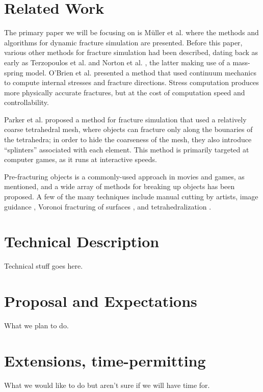 \documentclass[tog]{acmsiggraph}
\begin{document}
\section{Related Work}

The primary paper we will be focusing on is M\"uller et
al. \cite{Mul13} where the methods and algorithms for dynamic fracture
simulation are presented. Before this paper, various other methods for
fracture simulation had been described, dating back as early as
Terzopoulos et al. \cite{Ter88} and Norton et al. \cite{Nor91}, the
latter making use of a mass-spring model. O'Brien et al. \cite{Obr99}
presented a method that used continuum mechanics to compute internal
stresses and fracture directions. Stress computation produces more
physically accurate fractures, but at the cost of computation speed
and controllability.

Parker et al. \cite{Par09} proposed a method for fracture simulation
that used a relatively coarse tetrahedral mesh, where objects can
fracture only along the bounaries of the tetrahedra; in order to hide
the coarseness of the mesh, they also introduce ``splinters''
associated with each element. This method is primarily targeted at
computer games, as it runs at interactive speeds.

Pre-fracturing objects is a commonly-used approach in movies and
games, as mentioned, and a wide array of methods for breaking up
objects has been proposed. A few of the many techniques include manual
cutting by artists, image guidance \cite{Mou05}, Voronoi fracturing of
surfaces \cite{Rag02}, and tetrahedralization \cite{Par09}.

\section{Technical Description}

Technical stuff goes here.

\section{Proposal and Expectations}

What we plan to do.

\section{Extensions, time-permitting}

What we would like to do but aren't sure if we will have time for.




\end{document}
